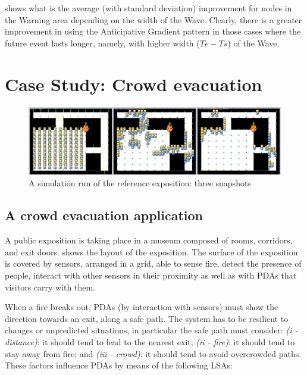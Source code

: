 \documentclass[12pt,a4paper,twoside,openright]{book}
\begin{document}
 shows what is the average (with standard deviation) improvement for nodes in the Warning area depending on the width of the Wave. Clearly, there is a greater improvement in using the Anticipative Gradient pattern in those cases where the future event lasts longer, namely, with higher width ($Te-Ts$) of the Wave.

\chapter{Case Study: Crowd evacuation}

\begin{figure}
    \includegraphics[width=\columnwidth]{img/run}
    \caption[Reference exposition for crowd evacuation]{A simulation run of the reference exposition: three snapshots\label{fig:generalmap}}    
\end{figure}


\section{A crowd evacuation application}

A public exposition is taking place in a museum composed of rooms, corridors, and exit doors.  shows the layout of the exposition.
%
The surface of the exposition is covered by sensors, arranged in a grid, able to sense fire, detect the presence of people, interact with other sensors in their proximity as well as with PDAs that visitors carry with them. 

When a fire breaks out, PDAs (by interaction with sensors) must show the direction towards an exit, along a safe path. The system has to be resilient to changes or unpredicted situations, in particular the safe path must consider: \emph{(i - distance)}: it should tend to lead to the nearest exit; \emph{(ii - fire)}: it should tend to stay away from fire; and \emph{(iii - crowd)}: it should tend to avoid overcrowded paths.
%
These factors  influence PDAs by means of the following LSAs:
\end{document}
